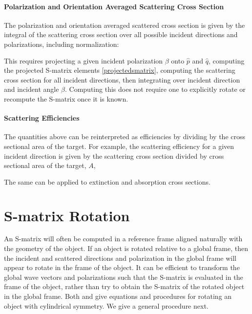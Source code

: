 \paragraph{Polarization and Orientation Averaged Scattering Cross Section}

The polarization and orientation averaged scattered cross section is given by the integral of the scattering cross section over all possible incident directions and polarizations, including normalization:

This requires projecting a given incident polarization $\beta$ onto $\hat{p}$ and $\hat{q}$, computing the projected S-matrix elements \eqref{projectedsmatrix}, computing the scattering cross section for all incident directions, then integrating over incident direction and incident angle $\beta$. Computing this does not require one to explicitly rotate or recompute the S-matrix once it is known.


\paragraph{Scattering Efficiencies} The quantities above can be reinterpreted as efficiencies by dividing by the cross sectional area of the target.  For example, the scattering efficiency for a given incident direction is given by the scattering cross section divided by cross sectional area of the target, $A$,  


The same can be applied to extinction and absorption cross sections.  

\section{S-matrix Rotation}

An S-matrix will often be computed in a reference frame aligned naturally with the geometry of the object. If an object is rotated relative to a global frame, then the incident and scattered directions and polarization in the global frame will appear to rotate in the frame of the object. It can be efficient to transform the global wave vectors and polarizations such that the S-matrix is evaluated in the frame of the object, rather than try to obtain the S-matrix of the rotated object in the global frame. Both \cite{tsang2000scattering} and \cite{van2011synthetic} give equations and procedures for rotating an object with cylindrical symmetry. We give a general procedure next.

